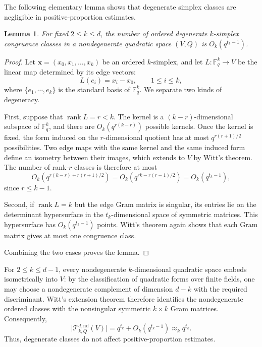 \documentclass[11pt]{article}
\newtheorem{lemma}[theorem]{Lemma}
\theoremstyle{remark}
\numberwithin{equation}{section}
\newcommand{\Fq}{\mathbb F_q}
\newcommand{\cT}{\mathcal T}
\newcommand{\rank}{\operatorname{rank}}
\newcommand{\1}{\mathbf 1}
\begin{document}
The following elementary lemma shows that degenerate simplex classes are negligible in positive-proportion estimates.

\begin{lemma} \label{lem:degenerate-classes}
For fixed \(2\leq k\leq d\), the number of ordered degenerate \(k\)-simplex congruence classes in a nondegenerate quadratic space $(V,Q)$ is $O_k(q^{t_k-1})$.
\end{lemma}

\begin{proof}
Let \(\mathbf x=(x_0,x_1,\ldots,x_k)\) be an ordered \(k\)-simplex, and let \(L:\Fq^k\to V\) be the linear map determined by its edge vectors:
\[
L(e_i)=x_i-x_0,\qquad 1\leq i\leq k,
\]
where $\{e_1,\cdots,e_k\}$ is the standard basis of $\Fq^k$. We separate two kinds of degeneracy.

First, suppose that \(\rank L=r< k\). The kernel is a \((k-r)\)-dimensional subspace of \(\Fq^k\), and there are \(O_k(q^{r(k-r)})\) possible kernels. Once the kernel is fixed, the form induced on the \(r\)-dimensional quotient has at most \(q^{r(r+1)/2}\) possibilities. Two edge maps with the same kernel and the same induced form define an isometry between their images, which extends to \(V\) by Witt's theorem. The number of rank-\(r\) classes is therefore at most
\[
 O_k\!\left(q^{r(k-r)+r(r+1)/2}\right)
 =
 O_k\!\left(q^{rk-r(r-1)/2}\right) = O_k\!\left(q^{t_k-1}\right),
\]
since $r\leq k-1$.

Second, if \(\rank L=k\) but the edge Gram matrix is singular, its entries lie on the determinant hypersurface in the \(t_k\)-dimensional space of symmetric matrices. This hypersurface has \(O_k(q^{t_k-1})\) points. Witt's theorem again shows that each Gram matrix gives at most one congruence class.

Combining the two cases proves the lemma.
\end{proof}

For \(2\leq k\leq d-1\), every nondegenerate \(k\)-dimensional quadratic space embeds isometrically into \(V\): by the classification of quadratic forms over finite fields, one may choose a nondegenerate complement of dimension \(d-k\) with the required discriminant. Witt's extension theorem therefore identifies the nondegenerate ordered classes with the nonsingular symmetric \(k\times k\) Gram matrices. Consequently,
\[
\bigl|\cT^{d,\mathrm{nd}}_{k,Q}(V)\bigr|
=
q^{t_k}+O_k(q^{t_k-1})
\approx_k q^{t_k}.
\]
Thus, degenerate classes do not affect positive-proportion estimates.
\end{document}
